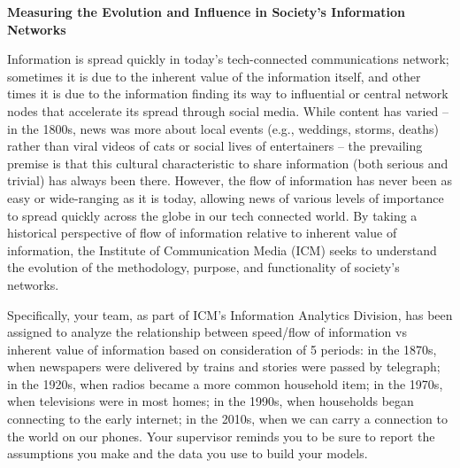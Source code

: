\documentclass[bwprint]{cumcmthesis}
\begin{document}
\begin{shaded}
{\setlength\parindent{1em}
\renewcommand{\baselinestretch}{1.0}
\begin{center}
\textbf{Measuring the Evolution and Influence in Society's Information Networks}
\end{center}

\small
\noindent Information is spread quickly in today's tech-connected communications network; sometimes it is due to the inherent value of the information itself, and other times it is due to the information finding its way to influential or central network nodes that accelerate its spread through social media. While content has varied -- in the 1800s, news was more about local events (e.g., weddings, storms, deaths) rather than viral videos of cats or social lives of entertainers -- the prevailing premise is that this cultural characteristic to share information (both serious and trivial) has always been there. However, the flow of information has never been as easy or wide-ranging as it is today, allowing news of various levels of importance to spread quickly across the globe in our tech connected world. By taking a historical perspective of flow of information relative to inherent value of information, the Institute of Communication Media (ICM) seeks to understand the evolution of the methodology, purpose, and functionality of society's networks.\newline

\noindent Specifically, your team, as part of ICM's Information Analytics Division, has been assigned to analyze the relationship between speed/flow of information vs inherent value of information based on consideration of 5 periods: in the 1870s, when newspapers were delivered by trains and stories were passed by telegraph; in the 1920s, when radios became a more common household item; in the 1970s, when televisions were in most homes; in the 1990s, when households began connecting to the early internet; in the 2010s, when we can carry a connection to the world on our phones. Your supervisor reminds you to be sure to report the assumptions you make and the data you use to build your models.\newline

}
\end{shaded}
\end{document}
